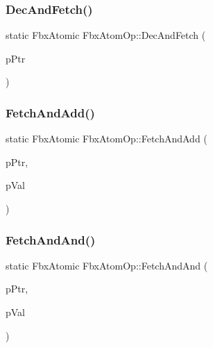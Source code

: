 \mbox{\label{class_fbx_atom_op_a1c5402b4ff3ee7e4bed3662109bcbe31}} 
\subsubsection{\texorpdfstring{Dec\+And\+Fetch()}{DecAndFetch()}}
{\footnotesize\ttfamily static Fbx\+Atomic Fbx\+Atom\+Op\+::\+Dec\+And\+Fetch (\begin{DoxyParamCaption}\item[{volatile Fbx\+Atomic $\ast$}]{p\+Ptr }\end{DoxyParamCaption})\hspace{0.3cm}{\ttfamily [static]}}

\mbox{\label{class_fbx_atom_op_a114fbda18ab3db31fa90d1349a3bc723}} 
\subsubsection{\texorpdfstring{Fetch\+And\+Add()}{FetchAndAdd()}}
{\footnotesize\ttfamily static Fbx\+Atomic Fbx\+Atom\+Op\+::\+Fetch\+And\+Add (\begin{DoxyParamCaption}\item[{volatile Fbx\+Atomic $\ast$}]{p\+Ptr,  }\item[{Fbx\+Atomic}]{p\+Val }\end{DoxyParamCaption})\hspace{0.3cm}{\ttfamily [static]}}

\mbox{\label{class_fbx_atom_op_a40652f1848358c1337083471805e01b0}} 
\subsubsection{\texorpdfstring{Fetch\+And\+And()}{FetchAndAnd()}}
{\footnotesize\ttfamily static Fbx\+Atomic Fbx\+Atom\+Op\+::\+Fetch\+And\+And (\begin{DoxyParamCaption}\item[{volatile Fbx\+Atomic $\ast$}]{p\+Ptr,  }\item[{Fbx\+Atomic}]{p\+Val }\end{DoxyParamCaption})\hspace{0.3cm}{\ttfamily [static]}}

